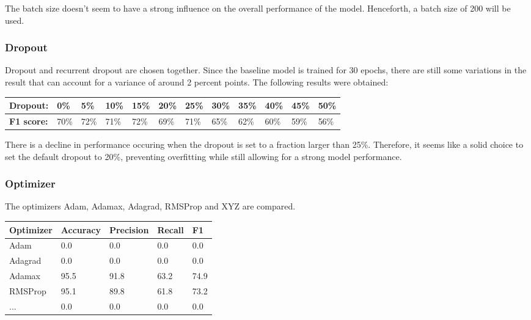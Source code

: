 \documentclass[
	a4paper,
	pagesize,
	pdftex,
	12pt,
	twoside, %
	BCOR=5mm, %
	ngerman,
	fleqn,
	final,
	]{scrartcl}
\begin{document}
The batch size doesn't seem to have a strong influence on the overall performance of the model. Henceforth, a batch size of 200 will be used.

\subsubsection{Dropout}

Dropout and recurrent dropout are chosen together. Since the baseline model is trained for 30 epochs, there are still some variations in the result that can account for a variance of around 2 percent points. The following results were obtained:

\begin{tabular} { | p{2cm} || p{0.8cm} | p{0.8cm} | p{0.8cm} | p{0.8cm}  | p{0.8cm} | p{0.8cm} | p{0.8cm} | p{0.8cm} | p{0.8cm} | p{0.8cm} | p{0.8cm} |}
\hline
\textbf{Dropout:}  & 0\% & 5\% & 10\% & 15\%   & 20\% & 25\% & 30\%   & 35\% & 40\% & 45\% & 50\% \\   
\hline
\textbf{F1 score:} & 70\% & 72\% & 71\% & 72\% & 69\% & 71\% & 65\% & 62\% & 60\% & 59\% & 56\% \\
\hline
\hline
\end{tabular}

There is a decline in performance occuring when the dropout is set to a fraction larger than 25\%. Therefore, it seems like a solid choice to set the default dropout to 20\%, preventing overfitting while still allowing for a strong model performance.



\subsubsection{Optimizer}

The optimizers Adam, Adamax, Adagrad, RMSProp and XYZ are compared. 

\begin{tabular}{ | p{2cm} || p{2cm}|p{2cm}|p{2cm}|p{2cm}|  }
	\hline
	Optimizer & Accuracy & Precision & Recall & F1 \\
	\hline
	Adam & 0.0 &  0.0 &  0.0 &  0.0 \\
	Adagrad & 0.0 &  0.0 &  0.0 &  0.0 \\
	Adamax & 95.5 &  91.8 &  63.2 &  74.9 \\
	RMSProp & 95.1 &  89.8 &  61.8 &  73.2 \\
	... & 0.0 &  0.0 &  0.0 &  0.0 \\
	\hline
	\hline
\end{tabular}
\end{document}
